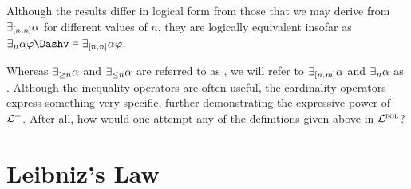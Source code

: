 Although the results differ in logical form from those that we may derive from $\exists_{[n,n]} \alpha$ for different values of $n$, they are logically equivalent insofar as $\qt{\exists_n}{\alpha}\metaA \Dashv\vDash \qt{\exists_{[n,n]}}{\alpha}\metaA$.

Whereas $\exists_{\geq n} \alpha$ and $\exists_{\leq n} \alpha$ are referred to as , we will refer to $\exists_{[n,m]} \alpha$ and $\exists_n \alpha$ as .
Although the inequality operators are often useful, the cardinality operators express something very specific, further demonstrating the expressive power of $\mathcal{L}^{=}$.
After all, how would one attempt any of the definitions given above in $\mathcal{L}^{\textsc{fol}}$?




\section{Leibniz's Law}

